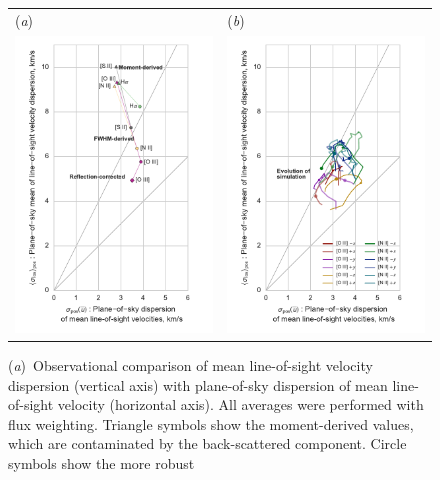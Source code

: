 \documentclass[useAMS,usenatbib]{mn2e}
\begin{document}
\begin{figure}
  \centering
  \begin{tabular}{@{}l@{}l@{}}
    (\textit{a}) & (\textit{b}) \\
    \includegraphics[width=0.48\linewidth]{obs-stats-plot} 
    & \includegraphics[width=0.48\linewidth]{sim-stats-plot} \\
  \end{tabular}
  \caption{(\textit{a})~Observational comparison of mean line-of-sight
    velocity dispersion (vertical axis) with plane-of-sky dispersion
    of mean line-of-sight velocity (horizontal axis).  All averages
    were performed with flux weighting.  Triangle symbols show the
    moment-derived values, which are contaminated by the
    back-scattered component.  Circle symbols show the more robust
}
\end{figure}
\end{document}

